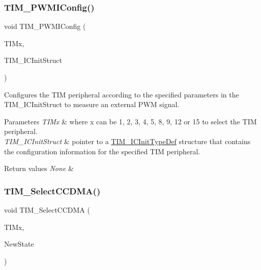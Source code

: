 \subsubsection{\texorpdfstring{TIM\_PWMIConfig()}{TIM\_PWMIConfig()}}
{\footnotesize\ttfamily void T\+I\+M\+\_\+\+P\+W\+M\+I\+Config (\begin{DoxyParamCaption}\item[{\mbox{\hyperlink{struct_t_i_m___type_def}{T\+I\+M\+\_\+\+Type\+Def}} $\ast$}]{T\+I\+Mx,  }\item[{\mbox{\hyperlink{struct_t_i_m___i_c_init_type_def}{T\+I\+M\+\_\+\+I\+C\+Init\+Type\+Def}} $\ast$}]{T\+I\+M\+\_\+\+I\+C\+Init\+Struct }\end{DoxyParamCaption})}



Configures the T\+IM peripheral according to the specified parameters in the T\+I\+M\+\_\+\+I\+C\+Init\+Struct to measure an external P\+WM signal. 


\begin{DoxyParams}{Parameters}
{\em T\+I\+Mx} & where x can be 1, 2, 3, 4, 5, 8, 9, 12 or 15 to select the T\+IM peripheral. \\
\hline
{\em T\+I\+M\+\_\+\+I\+C\+Init\+Struct} & pointer to a \mbox{\hyperlink{struct_t_i_m___i_c_init_type_def}{T\+I\+M\+\_\+\+I\+C\+Init\+Type\+Def}} structure that contains the configuration information for the specified T\+IM peripheral. \\
\hline
\end{DoxyParams}

\begin{DoxyRetVals}{Return values}
{\em None} & \\
\hline
\end{DoxyRetVals}
\mbox{\label{group___t_i_m___private___functions_ga5273cb65acb885fe7982827b1c6b7d75}} 
\subsubsection{\texorpdfstring{TIM\_SelectCCDMA()}{TIM\_SelectCCDMA()}}
{\footnotesize\ttfamily void T\+I\+M\+\_\+\+Select\+C\+C\+D\+MA (\begin{DoxyParamCaption}\item[{\mbox{\hyperlink{struct_t_i_m___type_def}{T\+I\+M\+\_\+\+Type\+Def}} $\ast$}]{T\+I\+Mx,  }\item[{\mbox{\hyperlink{group___exported__types_gac9a7e9a35d2513ec15c3b537aaa4fba1}{Functional\+State}}}]{New\+State }\end{DoxyParamCaption})}



